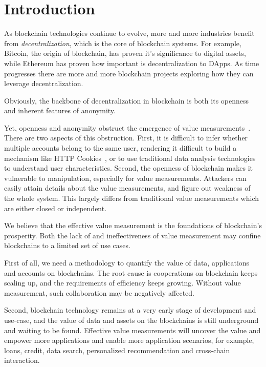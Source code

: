 
\section{Introduction}

As blockchain technologies continue to evolve, more and more industries benefit from \emph{decentralization}, which
is the core of blockchain systems. For example, Bitcoin, the origin of
blockchain, has proven it's significance to digital assets, while Ethereum has
proven how important is decentralization to DApps. As time progresses there are more and more
blockchain projects exploring how they can leverage decentralization.

Obviously, the backbone of decentralization in blockchain is both its openness and inherent features of anonymity.


Yet, openness and anonymity obstruct the emergence of value
measurements~\cite{meiklejohn2013fistful}. There are two aspects of this obstruction. First, it is
difficult to infer whether multiple accounts belong to the same user, rendering it difficult to build a mechanism like HTTP Cookies~\cite{Cookie}, or to use 
traditional data analysis technologies to understand user characteristics.
Second, the openness of blockchain makes it vulnerable to manipulation,
especially for value measurements. Attackers can easily attain details about the
value measurements, and figure out weakness of the whole system. This
largely differs from traditional value measurements which are either closed or
independent.

We believe that the effective value measurement is the foundations of
blockchain's prosperity. Both the lack of and ineffectiveness of value measurement may confine blockchains to a limited set of use cases.

First of all, we need a methodology to quantify the value of data,
applications and accounts on blockchains. The root cause is cooperations on
blockchain keeps scaling up, and the requirements of efficiency
keeps growing. Without value measurement, such collaboration may be negatively affected.

Second, blockchain technology remains at a very early stage of development and use-case, and the value of data
and assets on the blockchains is still underground and waiting to be found.
Effective value measurements will uncover the value and empower more applications and enable more application scenarios, for example, loans, credit, data search, personalized recommendation and cross-chain interaction.

